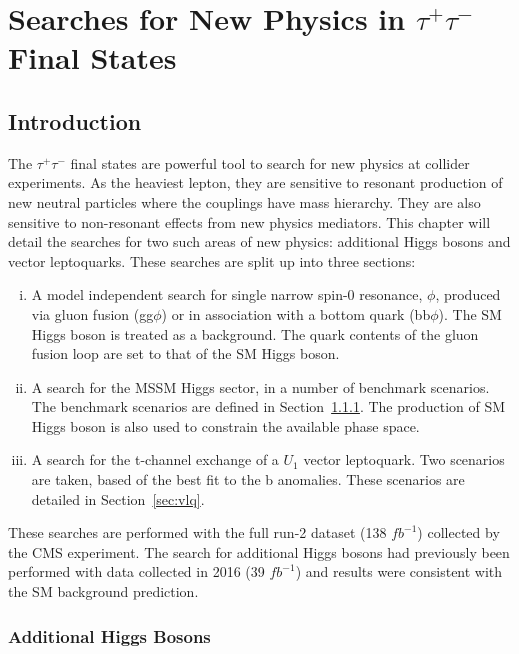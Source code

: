 \chapter{\texorpdfstring{Searches for New Physics in $\tau^+\tau^-$ Final States}{Search for new physics in tautau final states}}
\label{sec:bsm_H_to_tau_tau_analysis}

\section{Introduction}
 
The $\tau^+\tau^-$ final states are powerful tool to search for new physics at collider experiments. 
As the heaviest lepton, they are sensitive to resonant production of new neutral particles where the couplings have mass hierarchy.
They are also sensitive to non-resonant effects from new physics mediators. 
This chapter will detail the searches for two such areas of new physics: additional Higgs bosons and vector leptoquarks.
These searches are split up into three sections: 
\begin{enumerate}[i)]
  \item A model independent search for single narrow spin-0 resonance, $\phi$, produced via gluon fusion (gg$\phi$) or in association with a bottom quark (bb$\phi$). The SM Higgs boson is treated as a background. The quark contents of the gluon fusion loop are set to that of the SM Higgs boson.
   \item A search for the MSSM Higgs sector, in a number of benchmark scenarios. The benchmark scenarios are defined in Section~\ref{sec:additional_higgs_bosons}. The production of SM Higgs boson is also used to constrain the available phase space.
  \item A search for the t-channel exchange of a $U_{1}$ vector leptoquark. Two scenarios are taken, based of the best fit to the b anomalies. These scenarios are detailed in Section~\ref{sec:vlq}.
\end{enumerate}

These searches are performed with the full run-2 dataset (138 $fb^{-1}$) collected by the CMS experiment. The search for additional Higgs bosons had previously been performed with data collected in 2016 (39 $fb^{-1}$) and results were consistent with the SM background prediction.
 
\subsection{Additional Higgs Bosons} 
\label{sec:additional_higgs_bosons} 
 
